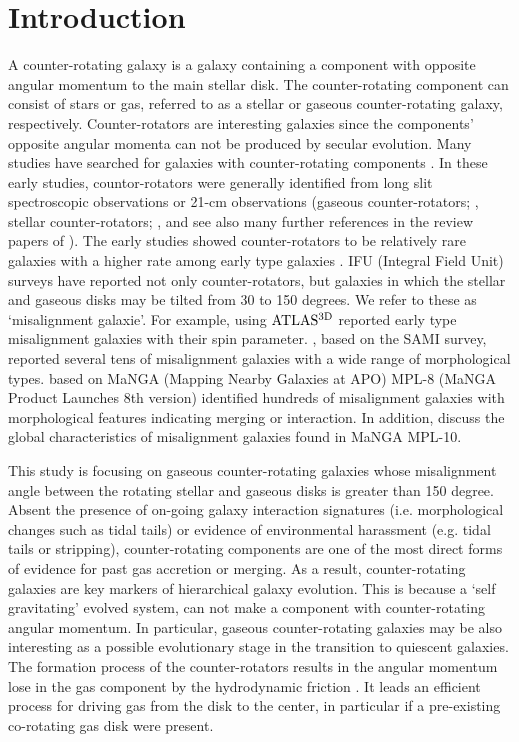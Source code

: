 \documentclass[fleqn,usenatbib]{mnras}
\begin{document}
\section{Introduction} \label{sec:intro}
A counter-rotating galaxy is a galaxy containing a component 
with opposite angular momentum to the main stellar disk.
The counter-rotating component can consist of stars or gas,
referred to as a stellar or gaseous counter-rotating galaxy, respectively.
Counter-rotators are interesting galaxies
since the components' opposite angular momenta can not be produced 
by secular evolution. 
Many studies have searched for galaxies with counter-rotating components
\citep{Bertola1985,Galletta1987,BWK,Rix1992,Bertola1992}. 
In these early studies, countor-rotators were generally identified
from long slit spectroscopic observations or 21-cm observations 
(gaseous counter-rotators; \citet{Galletta1987,BWK,Bertola1992}, 
stellar counter-rotators; \citet{Bertola1985,Rubin1992}, 
and see also many further references in the review papers of 
\citet{Galletta1996,BertolaCorsini1999,Corsini2014}).
The early studies showed counter-rotators to be relatively rare galaxies
with a higher rate among early type galaxies 
\citep{Bertola1992,Kuijken1996,KannappanFabricant2001,Pizzella2004}.
IFU (Integral Field Unit) surveys have reported not only counter-rotators, 
but galaxies in which the stellar and gaseous disks 
may be tilted from 30 to 150 degrees. We refer to these as `misalignment galaxie'.
For example, \citet{Davis2011} using $\rm ATLAS^{3D}$
reported early type misalignment galaxies with their spin parameter.
\citet{Bryant2019}, based on the SAMI survey, 
reported several tens of misalignment galaxies 
with a wide range of morphological types.
\citet{Li2021} based on MaNGA (Mapping Nearby Galaxies at APO) 
MPL-8 (MaNGA Product Launches 8th version) identified hundreds of misalignment galaxies 
with morphological features indicating merging or interaction.
In addition, \citet{Xu2022} discuss the global characteristics of 
misalignment galaxies found in MaNGA MPL-10.  

This study is focusing on gaseous counter-rotating galaxies
whose misalignment angle between the rotating stellar and gaseous disks 
is greater than 150 degree. 
Absent the presence of on-going galaxy interaction signatures 
(i.e. morphological changes such as tidal tails) or evidence of
environmental harassment (e.g. tidal tails or stripping), 
counter-rotating components are one of the most direct forms of 
evidence for past gas accretion or merging.
As a result, counter-rotating galaxies are key markers of 
hierarchical galaxy evolution. 
This is because a ‘self gravitating’ evolved system, 
can not make a component with counter-rotating angular momentum. 
In particular, gaseous counter-rotating galaxies may be also 
interesting as a possible evolutionary stage 
in the transition to quiescent galaxies.
The formation process of the counter-rotators results in 
the angular momentum lose in the gas component 
by the hydrodynamic friction \citep{Chen2016,Jin2016}.
It leads an efficient process for driving gas from the disk to the center,
in particular if a pre-existing co-rotating gas disk were present.
\end{document}
